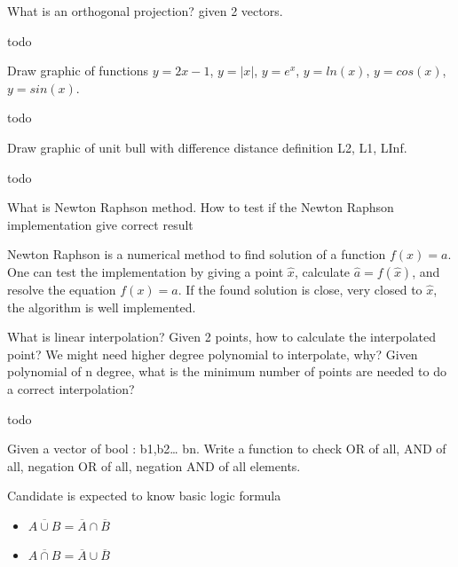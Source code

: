 \documentclass{exam}
\begin{document}
\begin{questions}
\question What is an orthogonal projection? given 2 vectors.
\begin{solution}[.2in]
	todo
\end{solution}

\question Draw graphic of functions $y=2x-1$, $y=|x|$, $y=e^x$, $y=ln(x)$, $y=cos(x)$, $y=sin(x)$.
\begin{solution}[.2in]
	todo
\end{solution}

\question Draw graphic of unit bull with difference distance definition L2, L1, LInf.
\begin{solution}[.2in]
	todo
\end{solution}

\question What is Newton Raphson method. How to test if the Newton Raphson implementation give correct result
\begin{solution}[.2in]
Newton Raphson is a numerical method to find solution of a function $f(x)=a$. One can test the implementation by giving a point $\hat{x}$, calculate $\hat{a}=f(\hat{x})$, and resolve the equation $f(x)=\hat{a}$. If the found solution is close, very closed to $\hat{x}$, the algorithm is well implemented.
\end{solution}

\question What is linear interpolation? Given 2 points, how to calculate the interpolated point? We might need higher degree polynomial to interpolate, why? Given polynomial of n degree, what is the minimum number of points are needed to do a correct interpolation?
\begin{solution}[.2in]
	todo
\end{solution}

\question Given a vector of bool : b1,b2… bn. Write a function to check OR of all, AND of all, negation OR of all, negation AND of all elements.
\begin{solution}[.2in]
Candidate is expected to know basic logic formula 
\begin{itemize}
	\item $\overline{A\cup B} = \overline{A}\cap \overline{B}$
    \item $\overline{A\cap B} = \overline{A}\cup \overline{B}$
\end{itemize}
\end{solution}


\end{questions}
\end{document}
